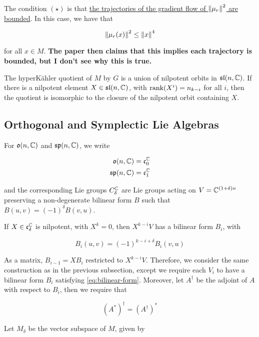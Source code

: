 \documentclass{article}
\renewcommand{\sl}{\mfs\mfl}
\renewcommand{\sp}{\mfs\mfp}
\begin{document}
The condition \((\star)\) is that \underline{the trajectories of the gradient flow of \(\norm{\mu_r}^2\) are bounded}. In this case, we have that

\[\norm{\mu_r(x)}^2 \le \norm{x}^4\]

for all \(x \in M\). \textbf{The paper then claims that this implies each trajectory is bounded, but I don't see why this is true.}

\addtocounter{theorem}{4}

\begin{theorem}
    The hyperK\"ahler quotient of \(M\) by \(G\) is a union of nilpotent orbits in \(\sl(n, \C)\). If there is a nilpotent element \(X \in \sl(n, \C)\), with \(\rank(X^i) = n_{k-i}\) for all \(i\), then the quotient is isomorphic to the closure of the nilpotent orbit containing \(X\).
\end{theorem}

\subsection{Orthogonal and Symplectic Lie Algebras}

For \(\mathfrak{o}(n, \mathbb{C})\) and \(\sp(n, \C)\), we write

\begin{align*}
    \mfo(n, \C) &= \mfc^\C_0\\
    \sp(n, \C) &= \mfc^\C_1
\end{align*}

and the corresponding Lie groups \(C^{\mathbb{C}}_\delta\) are Lie groups acting on \(V = \mathbb{C}^{(1 + \delta) n}\) preserving a non-degenerate bilinear form \(B\) such that \(B(u, v) = (-1)^\delta B(v, u)\).

If \(X \in \mathfrak{c}_\delta^{\mathbb{C}}\) is nilpotent, with \(X^k = 0\), then \(X^{k-i}V\) has a bilinear form \(B_i\), with

\begin{equation}
    \label{eq:bilinear-form}
    B_i(u, v) = (-1)^{k-i+\delta}B_i(v, u)
\end{equation}

As a matrix, \(B_{i-1} = XB_i\) restricted to \(X^{k-i}V\). Therefore, we consider the same construction as in the previous subsection, except we require each \(V_i\) to have a bilinear form \(B_i\) satisfying \cref{eq:bilinear-form}. Moreover, let \(A^\dagger\) be the adjoint of \(A\) with respect to \(B_i\), then we require that

\[(A^*)^\dagger = (A^\dagger)^*\]

Let \(M_\delta\) be the vector subspace of \(M\), given by
\end{document}
